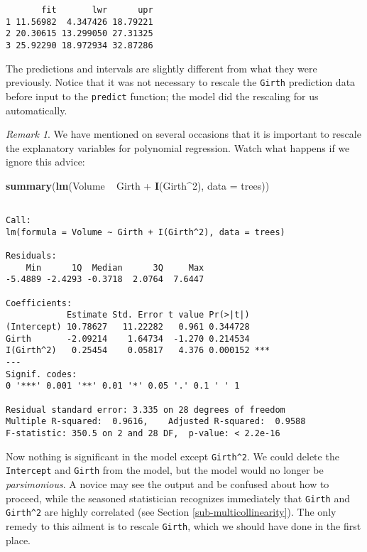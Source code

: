 \documentclass[]{book}
\newenvironment{Shaded}{\begin{snugshade}}{\end{snugshade}}
\newcommand{\KeywordTok}[1]{\textcolor[rgb]{0.13,0.29,0.53}{\textbf{{#1}}}}
\newcommand{\DataTypeTok}[1]{\textcolor[rgb]{0.13,0.29,0.53}{{#1}}}
\newcommand{\DecValTok}[1]{\textcolor[rgb]{0.00,0.00,0.81}{{#1}}}
\newcommand{\StringTok}[1]{\textcolor[rgb]{0.31,0.60,0.02}{{#1}}}
\newcommand{\NormalTok}[1]{{#1}}
\numberwithin{equation}{chapter}
\numberwithin{figure}{chapter}
\theoremstyle{plain}
\theoremstyle{definition}
\theoremstyle{remark}
\newtheorem{rem}[thm]{Remark}
\theoremstyle{definition}
\theoremstyle{definition}
\theoremstyle{remark}
\begin{document}
\begin{verbatim}
       fit       lwr      upr
1 11.56982  4.347426 18.79221
2 20.30615 13.299050 27.31325
3 25.92290 18.972934 32.87286
\end{verbatim}

The predictions and intervals are slightly different from what they were
previously. Notice that it was not necessary to rescale the
\texttt{Girth} prediction data before input to the \texttt{predict}
function; the model did the rescaling for us automatically.

\bigskip

\begin{rem}
We have mentioned on several occasions that it is important to rescale
the explanatory variables for polynomial regression. Watch what happens
if we ignore this advice:
\end{rem}

\begin{Shaded}
\begin{Highlighting}[]
\KeywordTok{summary}\NormalTok{(}\KeywordTok{lm}\NormalTok{(Volume ~}\StringTok{ }\NormalTok{Girth +}\StringTok{ }\KeywordTok{I}\NormalTok{(Girth^}\DecValTok{2}\NormalTok{), }\DataTypeTok{data =} \NormalTok{trees))}
\end{Highlighting}
\end{Shaded}

\begin{verbatim}

Call:
lm(formula = Volume ~ Girth + I(Girth^2), data = trees)

Residuals:
    Min      1Q  Median      3Q     Max 
-5.4889 -2.4293 -0.3718  2.0764  7.6447 

Coefficients:
            Estimate Std. Error t value Pr(>|t|)    
(Intercept) 10.78627   11.22282   0.961 0.344728    
Girth       -2.09214    1.64734  -1.270 0.214534    
I(Girth^2)   0.25454    0.05817   4.376 0.000152 ***
---
Signif. codes:  
0 '***' 0.001 '**' 0.01 '*' 0.05 '.' 0.1 ' ' 1

Residual standard error: 3.335 on 28 degrees of freedom
Multiple R-squared:  0.9616,    Adjusted R-squared:  0.9588 
F-statistic: 350.5 on 2 and 28 DF,  p-value: < 2.2e-16
\end{verbatim}

Now nothing is significant in the model except \texttt{Girth\^{}2}. We
could delete the \texttt{Intercept} and \texttt{Girth} from the model,
but the model would no longer be \emph{parsimonious}. A novice may see
the output and be confused about how to proceed, while the seasoned
statistician recognizes immediately that \texttt{Girth} and
\texttt{Girth\^{}2} are highly correlated (see Section
\ref{sub-multicollinearity}). The only remedy to this ailment is to
rescale \texttt{Girth}, which we should have done in the first place.
\end{document}
